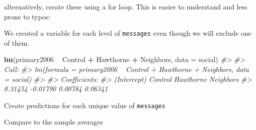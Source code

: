 \documentclass[]{book}
\newenvironment{Shaded}{\begin{snugshade}}{\end{snugshade}}
\newcommand{\KeywordTok}[1]{\textcolor[rgb]{0.13,0.29,0.53}{\textbf{#1}}}
\newcommand{\DataTypeTok}[1]{\textcolor[rgb]{0.13,0.29,0.53}{#1}}
\newcommand{\StringTok}[1]{\textcolor[rgb]{0.31,0.60,0.02}{#1}}
\newcommand{\CommentTok}[1]{\textcolor[rgb]{0.56,0.35,0.01}{\textit{#1}}}
\newcommand{\ControlFlowTok}[1]{\textcolor[rgb]{0.13,0.29,0.53}{\textbf{#1}}}
\newcommand{\OperatorTok}[1]{\textcolor[rgb]{0.81,0.36,0.00}{\textbf{#1}}}
\newcommand{\NormalTok}[1]{#1}
\theoremstyle{definition}
\theoremstyle{definition}
\theoremstyle{definition}
\theoremstyle{remark}
\begin{document}
alternatively, create these using a for loop. This is easier to
understand and less prone to typos:

\begin{Shaded}
\end{Shaded}

We created a variable for each level of \texttt{messages} even though we
will exclude one of them.

\begin{Shaded}
\begin{Highlighting}[]
\KeywordTok{lm}\NormalTok{(primary2006 }\OperatorTok{~}\StringTok{ }\NormalTok{Control }\OperatorTok{+}\StringTok{ }\NormalTok{Hawthorne }\OperatorTok{+}\StringTok{ }\NormalTok{Neighbors, }\DataTypeTok{data =}\NormalTok{ social)}
\CommentTok{#> }
\CommentTok{#> Call:}
\CommentTok{#> lm(formula = primary2006 ~ Control + Hawthorne + Neighbors, data = social)}
\CommentTok{#> }
\CommentTok{#> Coefficients:}
\CommentTok{#> (Intercept)      Control    Hawthorne    Neighbors  }
\CommentTok{#>     0.31454     -0.01790      0.00784      0.06341}
\end{Highlighting}
\end{Shaded}

Create predictions for each unique value of \texttt{messages}

\begin{Shaded}
\end{Shaded}

Compare to the sample averages

\begin{Shaded}
\end{Shaded}
\end{document}
